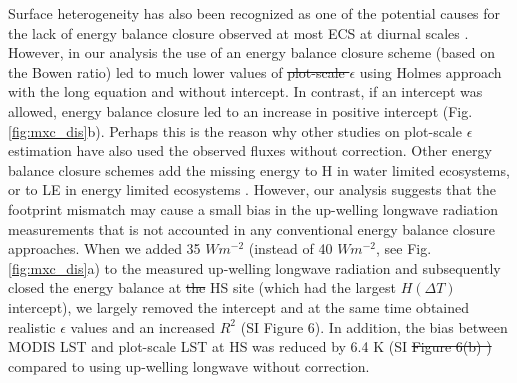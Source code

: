 \documentclass[fleqn,10pt]{wlscirep}
\providecommand{\DIFaddtex}[1]{{\protect\color{blue}\uwave{#1}}} %
\providecommand{\DIFdeltex}[1]{{\protect\color{red}\sout{#1}}}                      %
\providecommand{\DIFaddbegin}{} %
\providecommand{\DIFaddend}{} %
\providecommand{\DIFdelbegin}{} %
\providecommand{\DIFdelend}{} %
\providecommand{\DIFadd}[1]{\texorpdfstring{\DIFaddtex{#1}}{#1}} %
\providecommand{\DIFdel}[1]{\texorpdfstring{\DIFdeltex{#1}}{}} %
\begin{document}
Surface heterogeneity has also been recognized as one of the potential causes for the lack of energy balance closure observed at most ECS at diurnal scales \cite{wilson2002energy, stoy2013data}. However, in our analysis the use of an energy balance closure scheme (based on the Bowen ratio) led to much lower values of \DIFdelbegin \DIFdel{plot-scale $\epsilon$ }\DIFdelend \DIFaddbegin \DIFadd{$\epsilon_{plot}$ }\DIFaddend using Holmes approach with the long equation and without intercept. In contrast, if an intercept was allowed, energy balance closure led to an increase in positive intercept (Fig. \ref{fig:mxc_dis}b). Perhaps this is the reason why other studies on plot-scale $\epsilon$ estimation have also used the observed fluxes without correction\cite{holmes2009land,holmes2016cloud,maes2019potential}. Other energy balance closure schemes add the missing energy to H in water limited ecosystems\cite{twine2000correcting}, or to LE in energy limited ecosystems \cite{chakraborty2019biases}. However, our analysis suggests that the footprint mismatch may cause a small bias in the up-welling longwave radiation measurements that is not accounted in any conventional energy balance closure approaches. When we added 35 $Wm^{-2}$ (instead of 40 $Wm^{-2}$, see Fig. \ref{fig:mxc_dis}a) to the measured up-welling longwave radiation and subsequently closed the energy balance at \DIFdelbegin \DIFdel{the }\DIFdelend HS site (which had the largest $H(\Delta T)$ intercept), we largely removed the intercept and at the same time obtained realistic $\epsilon$ values and an increased $R^2$ (SI Figure 6). In addition, the bias between MODIS LST and plot-scale LST at HS was reduced by 6.4 K (SI \DIFdelbegin \DIFdel{Figure 6(b) ) }\DIFdelend \DIFaddbegin \DIFadd{Fig.6b) }\DIFaddend compared to using up-welling longwave without correction. 
\end{document}
